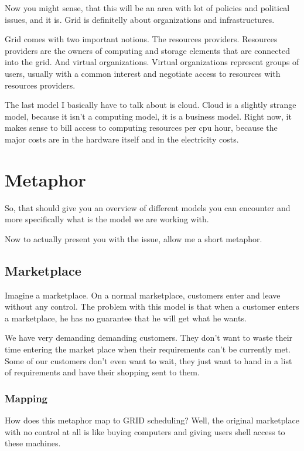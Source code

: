 \documentclass[10pt]{article}
\begin{document}
Now you might sense, that this will be an area with lot of policies and
political issues, and it is. Grid is definitelly about organizations and
infrastructures.

Grid comes with two important notions. The resources providers. Resources
providers are the owners of computing and storage elements that are connected
into the grid.  And virtual organizations. Virtual organizations represent
groups of users, usually with a common interest and negotiate access to
resources with resources providers.

The last model I basically have to talk about is cloud.
Cloud is a slightly strange model, because it isn't a computing model, it is a
business model. Right now, it makes sense to bill access to computing resources
per cpu hour, because the major costs are in the hardware itself and in the
electricity costs.

\section{Metaphor}

So, that should give you an overview of different models you can encounter and
more specifically what is the model we are working with.

Now to actually present you with the issue, allow me a short metaphor.

\subsection{Marketplace}

Imagine a marketplace. On a normal marketplace, customers enter and leave
without any control. The problem with this model is that when a customer enters
a marketplace, he has no guarantee that he will get what he wants.

We have very demanding demanding customers. They don't want to waste their time
entering the market place when their requirements can't be currently met. Some
of our customers don't even want to wait, they just want to hand in a list of
requirements and have their shopping sent to them.

\subsubsection{Mapping}

How does this metaphor map to GRID scheduling? Well, the original marketplace
with no control at all is like buying computers and giving users shell access
to these machines.
\end{document}
